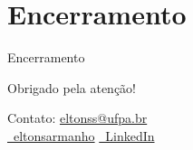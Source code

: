 \documentclass{beamer}
\begin{document}
\section{Encerramento}

\begin{frame}{Encerramento}
  \begin{center}
    \Large Obrigado pela atenção!
  \end{center}
  \vfill
  \begin{center}
    \small
    Contato: \href{mailto:eltonss@ufpa.br}{eltonss@ufpa.br}\\[0.2cm]
    \href{https://github.com/eltonsarmanho}{\faGithub\ eltonsarmanho} \quad
    \href{https://www.linkedin.com/in/elton-sarmanho-836553185/}{\faLinkedinSquare\ LinkedIn}
  \end{center}
\end{frame}
\end{document}
